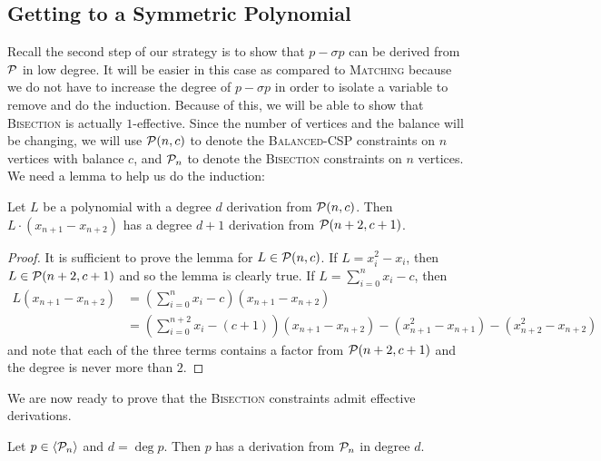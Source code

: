 \subsection{Getting to a Symmetric Polynomial}
Recall the second step of our strategy is to show that $p - \sigma p$ can be derived from $\mathcal P$ in low degree. It will be easier in this case as compared to \textsc{Matching} because we do not have to increase the degree of $p - \sigma p$ in order to isolate a variable to remove and do the induction. Because of this, we will be able to show that \textsc{Bisection} is actually $1$-effective.
Since the number of vertices and the balance will be changing, we will use $\mathcal P(n,c)$ to denote the \textsc{Balanced-CSP} constraints on $n$ vertices with balance $c$, and $\mathcal P_n$ to denote the \textsc{Bisection} constraints on $n$ vertices.
We need a lemma to help us do the induction:
\begin{lemma}\label{lem:bcsp-induct}
Let $L$ be a polynomial with a degree $d$ derivation from $\mathcal P(n,c)$. Then $L\cdot (x_{n+1} - x_{n+2})$ has a degree $d+1$ derivation from $\mathcal P(n+2,c+1)$. 
\end{lemma}
\begin{proof}
It is sufficient to prove the lemma for $L \in \mathcal P(n,c)$. If $L = x_i^2 - x_i$, then $L \in \mathcal P(n+2,c+1)$ and so the lemma is clearly true. If $L = \sum_{i=0}^n x_i - c$, then 
\begin{align*}
L(x_{n+1} - x_{n+2}) &= \left(\sum_{i=0}^n x_i - c\right)(x_{n+1} - x_{n+2}) \\
&= \left(\sum_{i=0}^{n+2} x_i - (c+1)\right)(x_{n+1} - x_{n+2}) - (x_{n+1}^2 - x_{n+1}) - (x_{n+2}^2 - x_{n+2})
\end{align*}
and note that each of the three terms contains a factor from $\mathcal P(n+2,c+1)$ and the degree is never more than $2$. 
\end{proof}
We are now ready to prove that the \textsc{Bisection} constraints admit effective derivations.
\begin{theorem}\label{thm:bisec-effective}
Let $p \in \langle \mathcal P_n \rangle$ and $d = \deg p$. Then $p$ has a derivation from $\mathcal P_n$ in degree $d$. 
\end{theorem}
